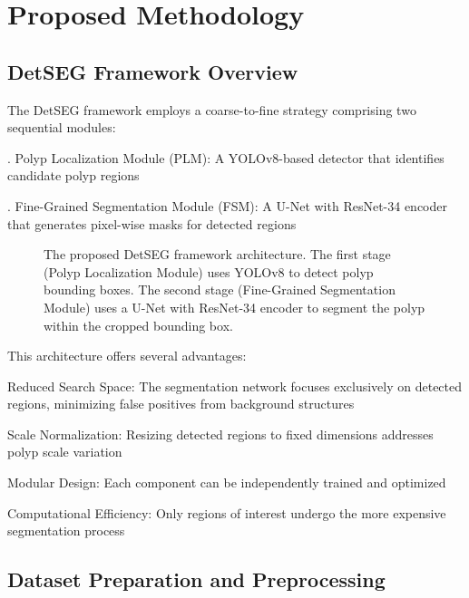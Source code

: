 \documentclass[runningheads]{llncs}
\begin{document}
\section{Proposed Methodology}

\subsection{DetSEG Framework Overview}

The DetSEG framework employs a coarse-to-fine strategy comprising two sequential modules:

. Polyp Localization Module (PLM): A YOLOv8-based detector that identifies candidate polyp regions

. Fine-Grained Segmentation Module (FSM): A U-Net with ResNet-34 encoder that generates pixel-wise masks for detected regions

\begin{figure}[htbp]
\centering
\caption{The proposed DetSEG framework architecture. The first stage (Polyp Localization Module) uses YOLOv8 to detect polyp bounding boxes. The second stage (Fine-Grained Segmentation Module) uses a U-Net with ResNet-34 encoder to segment the polyp within the cropped bounding box.}
\label{fig:architecture}
\end{figure}

This architecture offers several advantages:

\noindent Reduced Search Space: The segmentation network focuses exclusively on detected regions, minimizing false positives from background structures

\noindent Scale Normalization: Resizing detected regions to fixed dimensions addresses polyp scale variation

\noindent Modular Design: Each component can be independently trained and optimized

\noindent Computational Efficiency: Only regions of interest undergo the more expensive segmentation process

% 

\subsection{Dataset Preparation and Preprocessing}
\end{document}
